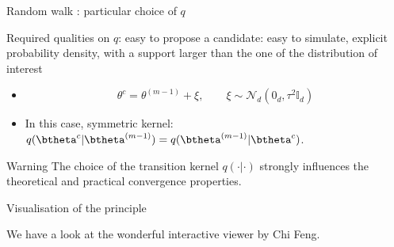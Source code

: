  \begin{frame}{Random walk : particular choice of $q$}
  
 \vert Required qualities on $q$:  \noir  easy to propose a candidate: easy to  simulate, explicit probability density, with a support larger than the one of the distribution of interest 
 
 
 \begin{itemize}
 \item 
  $$ \theta^{c}  = \theta^{(m-1)} + \xi, \quad \quad \xi\sim \mathcal{N}_d(0_d, \tau^2 \mathbb{I}_d)$$
  \item In this case, symmetric kernel: $q(\btheta^{c} | \btheta^{(m-1)}) = q(\btheta^{(m-1)}| \btheta^{c} )$. 
  \end{itemize}
 
 \begin{block}{Warning}
The choice of the transition kernel  $q(\cdot | \cdot)$ strongly influences the theoretical and practical convergence properties.  
\end{block}
\end{frame}
 
 
\begin{frame}{Visualisation of the principle}

We have a look at the wonderful interactive viewer by Chi Feng. 
\href{https://chi-feng.github.io/mcmc-demo/app.html?algorithm=RandomWalkMH&target=banana}{}


\end{frame}


